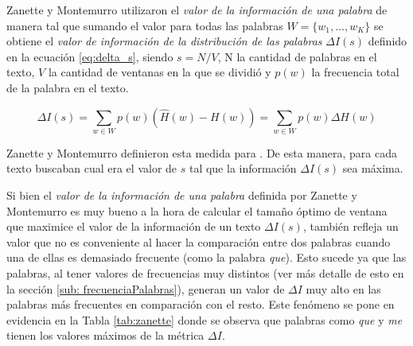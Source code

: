 Zanette y Montemurro utilizaron el \textit{valor de la información de una palabra} de manera tal que sumando el valor para todas las palabras $W = \{w_1,\dots,w_K\}$ se obtiene el \textit{valor de información de la distribución de las palabras} $\Delta I(s)$ definido en la ecuación \ref{eq:delta_s}, siendo  $s = N/V$, N la cantidad de palabras en el texto, $V$ la cantidad de ventanas en la que se dividió y $p(w)$ la frecuencia total de la palabra en el texto.

\begin{equation}
  \Delta I(s) = \sum\limits_{w \in W } p(w) (\widehat{H}(w) - H(w)) = \sum\limits_{w \in W } p(w) \Delta H(w) 
  \label{eq:delta_s}
\end{equation}

Zanette y Montemurro definieron esta medida para . De esta manera, para cada texto buscaban cual era el valor de $s$ tal que la información $\Delta I(s)$ sea máxima.


Si bien el \textit{valor de la información de una palabra} definida por Zanette y Montemurro es muy bueno a la hora de calcular el tamaño óptimo de ventana que maximice el valor de la información de un texto $\Delta I(s)$, también refleja un valor que no es conveniente al hacer la comparación entre dos palabras cuando una de ellas es demasiado frecuente (como la palabra \textit{que}). Esto sucede ya que las palabras, al tener valores de frecuencias muy distintos (ver más detalle de esto en la sección \ref{sub: frecuenciaPalabras}), generan un valor de $\Delta I$ muy alto en las palabras más frecuentes en comparación con el resto. Este fenómeno se pone en evidencia en la Tabla \ref{tab:zanette} donde se observa que palabras como \textit{que} y \textit{me} tienen los valores máximos de la métrica $\Delta I$.



